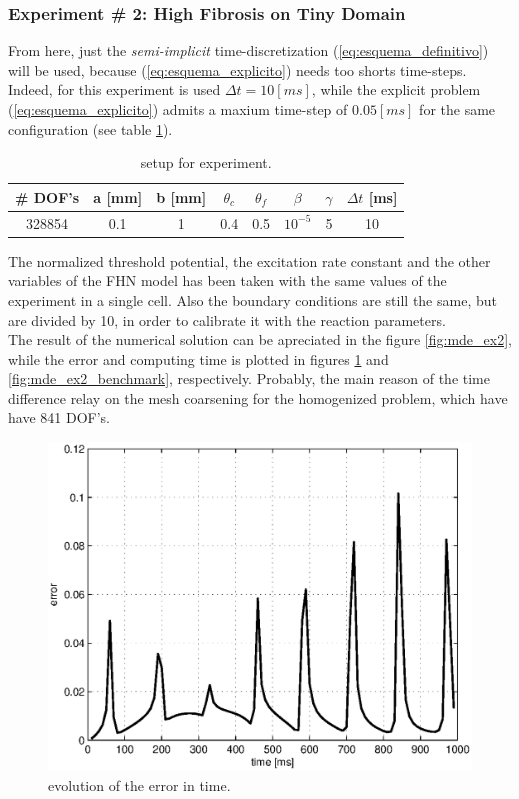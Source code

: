 \newpage 
\subsubsection{Experiment \# 2: High Fibrosis on Tiny Domain}

 From here, just the \textsl{semi-implicit} time-discretization (\ref{eq:esquema_definitivo}) will be used, because (\ref{eq:esquema_explicito}) needs too shorts time-steps. Indeed, for this experiment is used $\Delta t = 10 [ms]$, while the explicit problem (\ref{eq:esquema_explicito}) admits a maxium time-step of $0.05 [ms]$ for the same configuration (see table \ref{tab:mde_setup_2}).

\begin{table}[H]
\centering
\begin{tabular}{@{}cccccccc@{}}
\toprule
 \# DOF's & a {[}mm{]} & b {[}mm{]} & $\theta_c$ & $\theta_f$ & $\beta$   & $\gamma$ & $\Delta t$ [ms]\\ \midrule
 328854   & 0.1        & 1          & 0.4        & 0.5        & $10^{-5}$     & 5   & 10     \\ \bottomrule
\end{tabular}
\caption{setup for experiment.} \label{tab:mde_setup_2}
\end{table}

The normalized threshold potential, the excitation rate constant and the other variables of the FHN model has been taken with the same values of the experiment in a single cell. Also the boundary conditions are still the same, but are divided by 10, in order to calibrate it with the reaction parameters. \\

The result of the numerical solution can be apreciated in the figure \ref{fig:mde_ex2}, while the error and computing time is plotted in figures \ref{fig:mde_ex2_error} and \ref{fig:mde_ex2_benchmark}, respectively. Probably, the main reason of the time difference relay on the mesh coarsening for the homogenized problem, which have have 841 DOF's. 

\begin{figure}[H]
\centering
\includegraphics[height = 7 cm]{fig/numerical_example_MDE_exp1_error}
\caption{evolution of the error in time.} \label{fig:mde_ex2_error}
\end{figure}

